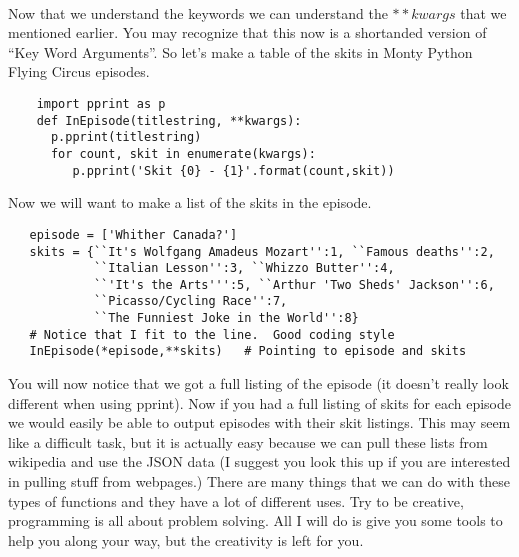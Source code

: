 \documentclass[11pt]{article}   %
\begin{document}
 \\
 Now that we understand the keywords we can understand the $**kwargs$ that we mentioned earlier.  You may recognize that this now is a shortanded version of ``Key Word Arguments''.  So let's make a table of the skits in Monty Python
 Flying Circus episodes.  
 \begin{tcolorbox}
    \begin{lstlisting}
    import pprint as p
    def InEpisode(titlestring, **kwargs):
      p.pprint(titlestring)
      for count, skit in enumerate(kwargs):
         p.pprint('Skit {0} - {1}'.format(count,skit))
   \end{lstlisting}
\end{tcolorbox}
Now we will want to make a list of the skits in the episode.
\begin{tcolorbox}
   \begin{lstlisting}
   episode = ['Whither Canada?']
   skits = {``It's Wolfgang Amadeus Mozart'':1, ``Famous deaths'':2, 
            ``Italian Lesson'':3, ``Whizzo Butter'':4, 
            ``'It's the Arts''':5, ``Arthur 'Two Sheds' Jackson'':6, 
            ``Picasso/Cycling Race'':7, 
            ``The Funniest Joke in the World'':8}
   # Notice that I fit to the line.  Good coding style
   InEpisode(*episode,**skits)   # Pointing to episode and skits
   \end{lstlisting}
\end{tcolorbox}

You will now notice that we got a full listing of the episode (it doesn't really look different when using pprint).  Now if you had a full listing of skits for each episode we would easily be able to output episodes with their skit
listings.  This may seem like a difficult task, but it is actually easy because we can pull these lists from wikipedia and use the JSON data (I suggest you look this up if you are interested in pulling stuff from webpages.)  There are
many things that we can do with these types of functions and they have a lot of different uses.  Try to be creative, programming is all about problem solving.  All I will do is give you some tools to help you along your way, but the
creativity is left for you.
\end{document}
